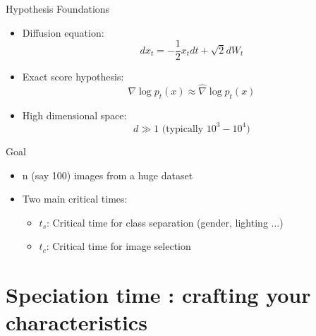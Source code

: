 \documentclass[aspectratio=169]{beamer}
\begin{document}
\begin{frame}{Hypothesis Foundations}
    \begin{itemize}
        \item Diffusion equation:
        \begin{equation}
            dx_t = -\frac{1}{2} x_t dt + \sqrt{2} dW_t
        \end{equation}
        
        \item Exact score hypothesis:
        \begin{equation}
            \nabla \log p_t(x) \approx \hat{\nabla} \log p_t(x)
        \end{equation}
        
        \item High dimensional space:
        \begin{equation}
            d \gg 1 \text{ (typically } 10^3-10^4\text{)}
        \end{equation}
    \end{itemize}
\end{frame}



\begin{frame}{Goal}

    
    \begin{itemize}
        \item n (say 100) images from a huge dataset
        \item Two main critical times:
        \begin{itemize}
            \item $t_s$: Critical time for class separation (gender, lighting ...)
            \item $t_c$: Critical time for image selection
        \end{itemize}
    \end{itemize}
\end{frame}











\section{Speciation time : crafting your characteristics}
\end{document}
